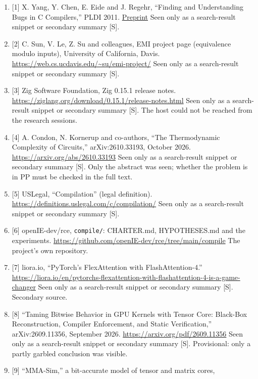 \documentclass[10pt,letterpaper]{article}
\providecommand{\tightlist}{\setlength{\itemsep}{1pt}\setlength{\parskip}{0pt}}
\begin{document}
\begin{enumerate}
\def\labelenumi{\arabic{enumi}.}
\tightlist
\item
  {[}1{]} X. Yang, Y. Chen, E. Eide and J. Regehr, ``Finding and
  Understanding Bugs in C Compilers,'' PLDI 2011.
  \href{https://www-old.cs.utah.edu/~regehr/papers/pldi11-preprint.pdf}{Preprint}
  Seen only as a search-result snippet or secondary summary {[}S{]}.
\item
  {[}2{]} C. Sun, V. Le, Z. Su and colleagues, EMI project page
  (equivalence modulo inputs), University of California, Davis.
  \url{https://web.cs.ucdavis.edu/~su/emi-project/} Seen only as a
  search-result snippet or secondary summary {[}S{]}.
\item
  {[}3{]} Zig Software Foundation, Zig 0.15.1 release notes.
  \url{https://ziglang.org/download/0.15.1/release-notes.html} Seen only
  as a search-result snippet or secondary summary {[}S{]}. The host
  could not be reached from the research sessions.
\item
  {[}4{]} A. Condon, N. Kornerup and co-authors, ``The Thermodynamic
  Complexity of Circuits,'' arXiv:2610.33193, October 2026.
  \url{https://arxiv.org/abs/2610.33193} Seen only as a search-result
  snippet or secondary summary {[}S{]}. Only the abstract was seen;
  whether the problem is in PP must be checked in the full text.
\item
  {[}5{]} USLegal, ``Compilation'' (legal definition).
  \url{https://definitions.uslegal.com/c/compilation/} Seen only as a
  search-result snippet or secondary summary {[}S{]}.
\item
  {[}6{]} openIE-dev/rce, \texttt{compile/}: CHARTER.md, HYPOTHESES.md
  and the experiments.
  \url{https://github.com/openIE-dev/rce/tree/main/compile} The
  project's own repository.
\item
  {[}7{]} liora.io, ``PyTorch's FlexAttention with FlashAttention-4.''
  \url{https://liora.io/en/pytorchs-flexattention-with-flashattention-4-is-a-game-changer}
  Seen only as a search-result snippet or secondary summary {[}S{]}.
  Secondary source.
\item
  {[}8{]} ``Taming Bitwise Behavior in GPU Kernels with Tensor Core:
  Black-Box Reconstruction, Compiler Enforcement, and Static
  Verification,'' arXiv:2609.11356, September 2026.
  \url{https://arxiv.org/pdf/2609.11356} Seen only as a search-result
  snippet or secondary summary {[}S{]}. Provisional: only a partly
  garbled conclusion was visible.
\item
  {[}9{]} ``MMA-Sim,'' a bit-accurate model of tensor and matrix cores,

\end{enumerate}
\end{document}
